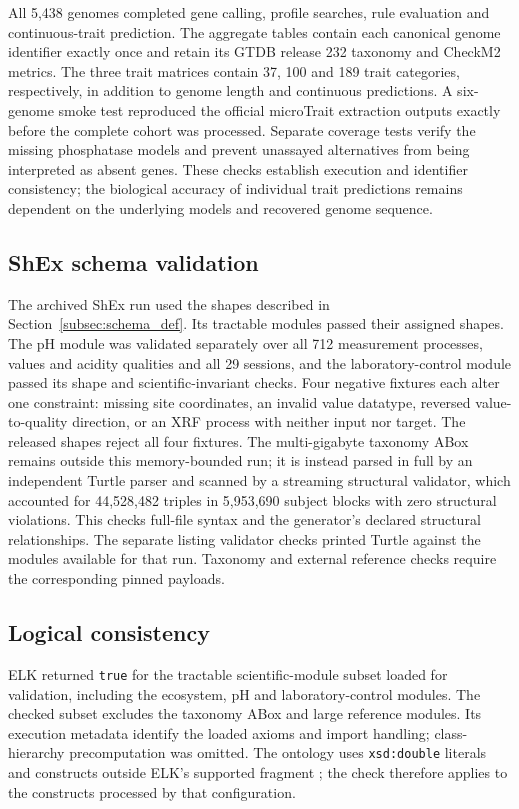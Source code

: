 \begin{revision}
All 5,438 genomes completed gene calling, profile searches, rule evaluation and continuous-trait prediction. The aggregate tables contain each canonical genome identifier exactly once and retain its GTDB release 232 taxonomy and CheckM2 metrics. The three trait matrices contain 37, 100 and 189 trait categories, respectively, in addition to genome length and continuous predictions. A six-genome smoke test reproduced the official microTrait extraction outputs exactly before the complete cohort was processed. Separate coverage tests verify the missing phosphatase models and prevent unassayed alternatives from being interpreted as absent genes. These checks establish execution and identifier consistency; the biological accuracy of individual trait predictions remains dependent on the underlying models and recovered genome sequence.

\subsection{ShEx schema validation}

The archived ShEx run used the shapes described in
Section~\ref{subsec:schema_def}. Its tractable modules passed their
assigned shapes. The pH module was
validated separately over all 712 measurement processes, values and
acidity qualities and all 29 sessions, and the laboratory-control
module passed its shape and scientific-invariant checks. Four negative
fixtures each alter one constraint: missing site coordinates, an invalid
value datatype, reversed value-to-quality direction, or an XRF process
with neither input nor target. The released shapes reject all four
fixtures. The
multi-gigabyte taxonomy ABox remains outside this memory-bounded run;
it is instead parsed in full by an independent Turtle parser and
scanned by a streaming structural validator, which accounted for
44,528,482 triples in 5,953,690 subject blocks with zero structural
violations. This checks full-file syntax and the generator's declared structural
relationships. The separate listing validator checks printed Turtle
against the modules available for that run. Taxonomy and external
reference checks require the corresponding pinned payloads.

\subsection{Logical consistency}

ELK returned \texttt{true} for the tractable scientific-module subset
loaded for validation, including the ecosystem, pH and laboratory-control
modules. The checked subset excludes the taxonomy ABox and large reference
modules. Its execution metadata identify the loaded axioms and import
handling; class-hierarchy precomputation was omitted. The ontology uses \texttt{xsd:double} literals and constructs
outside ELK's supported fragment \cite{owl2profiles}; the check therefore
applies to the constructs processed by that configuration.


\end{revision}
